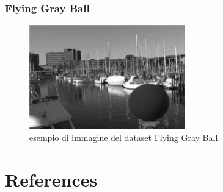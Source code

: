 \documentclass[aspectratio=169]{beamer}
\begin{document}
     \begin{frame}
       \frametitle{Flying Gray Ball}

        \begin{figure}[h]
          \centering
          \includegraphics[width=0.6\textwidth]{img/flying-ball-dataset-sample.png}
          \caption{esempio di immagine del dataset Flying Gray Ball}
          \label{fig:flying-ball-dataset-sample}
        \end{figure}

    \end{frame}
  \section{References}
    \begin{frame}[allowframebreaks]
      \printbibliography
    \end{frame}
\end{document}
